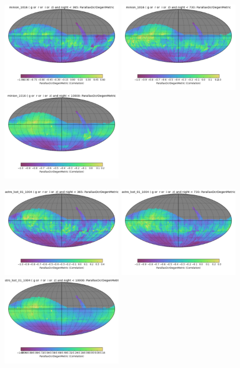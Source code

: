 \begin{figure}[ht]
  \begin{center}
  \includegraphics[width=2.0in]{./figs/milkyway/astromPanels/MW_Astrom_paDcrDegen_Baseline_01y_map.png}
  \includegraphics[width=2.0in]{./figs/milkyway/astromPanels/MW_Astrom_paDcrDegen_Baseline_02y_map.png}
  \includegraphics[width=2.0in]{./figs/milkyway/astromPanels/MW_Astrom_paDcrDegen_Baseline_10y_map.png}
  \end{center}
  \begin{center}
  \includegraphics[width=2.0in]{./figs/milkyway/astromPanels/MW_Astrom_paDcrDegen_wfdPlane_01y_map.png}
  \includegraphics[width=2.0in]{./figs/milkyway/astromPanels/MW_Astrom_paDcrDegen_wfdPlane_02y_map.png}
  \includegraphics[width=2.0in]{./figs/milkyway/astromPanels/MW_Astrom_paDcrDegen_wfdPlane_10y_map.png}
  \end{center}


\end{figure}
